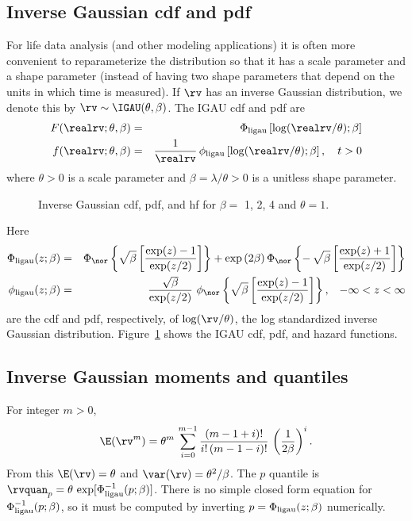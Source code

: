 \subsection{Inverse Gaussian cdf and pdf}
\label{section:igau.pdfcdf}
For life data analysis (and other modeling applications)
it is often more convenient to reparameterize the distribution
so that it has a scale parameter
and a shape parameter (instead of having two shape parameters that
depend on the units in which time is measured).
If $\rv$ has an inverse Gaussian distribution,
we denote this by $\rv \sim \IGAU(\theta, \beta)$. The IGAU cdf and
pdf are
\begin{eqnarray}  
\label{equation:igau.cdf}
F(\realrv;\theta, \beta) &=&
\Phi_{\rm ligau}\left [ \log(\realrv/\theta); \beta 
	     \right ]
\\
 f(\realrv;\theta, \beta)&=&
	\frac{1}{\realrv} \, 
\phi_{\rm ligau}\left [ \log(\realrv/\theta); \beta 
	     \right ], \quad t>0 \nonumber \end{eqnarray} where
 $\theta>0$ is a scale parameter and $\beta=\lambda/\theta>0$ is a
 unitless shape parameter.
\begin{figure}
\caption{Inverse Gaussian cdf, pdf, 
and hf for $\beta=$ 1, 2, 4 and $\theta=1$.}
\label{figure:distplot.igau.ps}
\end{figure}
Here
\begin{eqnarray*}  
\Phi_{\rm ligau}(z;\beta) &=&
\Phi_{\nor}\left \{ \sqrt{\beta}  \left [
\frac{ \exp(z) -1 }  {\exp(z/2)  } \right ] \right \} +
\exp \left (2 \beta \right )\Phi_{\nor}\left \{-\, \sqrt{\beta}  \left [
\frac{ \exp(z) +1 }  {\exp(z/2) } \right ]\right \}
\\
 \phi_{\rm ligau}(z;\beta)&=&
	   \frac{\sqrt{\beta }}
		{\exp(z/2)}
       \,\,
\phi_{\nor}\left \{
		 \sqrt{\beta} 		 \left [
\frac{ 		 \exp(z) -1 		 } 		 {
\exp(z/2) 		 } 		 \right ]
\right \},
\,\,\,\,\, -\infty< z < \infty
\end{eqnarray*}
are the cdf and pdf, respectively, of  $\log(\rv/\theta)$,
the log standardized inverse Gaussian distribution.
Figure~\ref{figure:distplot.igau.ps} shows the IGAU cdf, pdf, and
hazard functions.
\subsection{Inverse Gaussian moments and quantiles}
For integer $m>0$,
\begin{displaymath}
	\E(\rv^{m})=
\theta^{m} \,
	\sum_{i=0}^{m-1} \frac{(m-1+i)!}
			       {i!\,(m-1-i)!}
	\, \left (
	   \frac{1}
		{2 \beta}
	   \right )^{i}.
\end{displaymath}
From this  $\E(\rv)= \theta$ and $\var(\rv)=
\theta^{2}/\beta$.  
The $p$ quantile is $\rvquan_{p}=\theta \, \exp[\Phi^{-1}_{\rm
ligau}(p;\beta)]$.  There is no simple closed form equation for
$\Phi^{-1}_{\rm ligau}(p;\beta)$, so it must be computed by inverting
$p=\Phi_{\rm ligau}(z;\beta)$ numerically.

